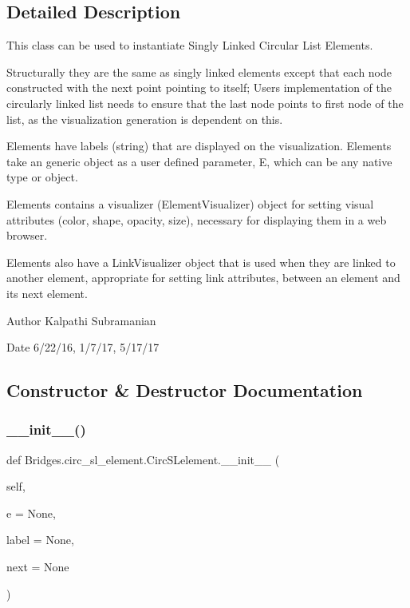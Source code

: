 \subsection{Detailed Description}
This class can be used to instantiate Singly Linked Circular List Elements. 

Structurally they are the same as singly linked elements except that each node constructed with the next point pointing to itself; User\textquotesingle{}s implementation of the circularly linked list needs to ensure that the last node points to first node of the list, as the visualization generation is dependent on this.

Elements have labels (string) that are displayed on the visualization. Elements take an generic object as a user defined parameter, E, which can be any native type or object.

Elements contains a visualizer (Element\+Visualizer) object for setting visual attributes (color, shape, opacity, size), necessary for displaying them in a web browser.

Elements also have a Link\+Visualizer object that is used when they are linked to another element, appropriate for setting link attributes, between an element and its next element.

\begin{DoxyAuthor}{Author}
Kalpathi Subramanian
\end{DoxyAuthor}
\begin{DoxyDate}{Date}
6/22/16, 1/7/17, 5/17/17 
\end{DoxyDate}


\subsection{Constructor \& Destructor Documentation}
\mbox{\label{class_bridges_1_1circ__sl__element_1_1_circ_s_lelement_a36a23cc30ce7dc037db8a8734adb37da}} 
\subsubsection{\texorpdfstring{\+\_\+\+\_\+init\+\_\+\+\_\+()}{\_\_init\_\_()}}
{\footnotesize\ttfamily def Bridges.\+circ\+\_\+sl\+\_\+element.\+Circ\+S\+Lelement.\+\_\+\+\_\+init\+\_\+\+\_\+ (\begin{DoxyParamCaption}\item[{}]{self,  }\item[{}]{e = {\ttfamily None},  }\item[{}]{label = {\ttfamily None},  }\item[{}]{next = {\ttfamily None} }\end{DoxyParamCaption})}



